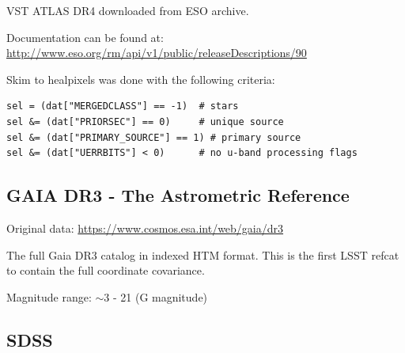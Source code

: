 VST ATLAS DR4 downloaded from ESO archive.

Documentation can be found at: \url{http://www.eso.org/rm/api/v1/public/releaseDescriptions/90}

Skim to healpixels was done with the following criteria:
\begin{verbatim}
sel = (dat["MERGEDCLASS"] == -1)  # stars
sel &= (dat["PRIORSEC"] == 0)     # unique source 
sel &= (dat["PRIMARY_SOURCE"] == 1) # primary source 
sel &= (dat["UERRBITS"] < 0)      # no u-band processing flags
\end{verbatim}

\subsection{GAIA DR3 - The Astrometric Reference}
\label{sec:gaiadr3}
Original data: \url{https://www.cosmos.esa.int/web/gaia/dr3}

The full Gaia DR3 catalog in indexed HTM format. 
This is the first LSST refcat to contain the full coordinate covariance.

Magnitude range: $\sim$3 - 21 (G magnitude)

\subsection{SDSS}
\label{sec:sdss}




